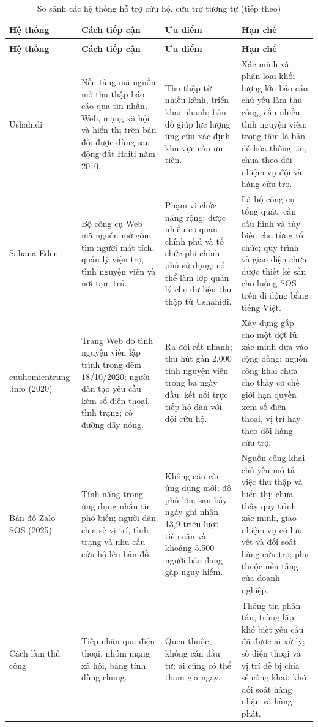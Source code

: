 \documentclass[12pt,a4paper,oneside]{report}
\begin{document}
{\small
\begin{longtable}{|L{2.4cm}|L{4.0cm}|L{3.9cm}|L{4.3cm}|}
  \caption{So sánh các hệ thống hỗ trợ cứu hộ, cứu trợ tương tự}\label{tab:similar-systems}\\
  \hline
  \centering\textbf{Hệ thống} & \centering\textbf{Cách tiếp cận} & \centering\textbf{Ưu điểm} & \centering\arraybackslash\textbf{Hạn chế} \\
  \hline
  \endfirsthead
  \caption[]{So sánh các hệ thống hỗ trợ cứu hộ, cứu trợ tương tự (tiếp theo)}\\
  \hline
  \centering\textbf{Hệ thống} & \centering\textbf{Cách tiếp cận} & \centering\textbf{Ưu điểm} & \centering\arraybackslash\textbf{Hạn chế} \\
  \hline
  \endhead
  Ushahidi & Nền tảng mã nguồn mở thu thập báo cáo qua tin nhắn, Web, mạng xã hội và hiển thị trên bản đồ; được dùng sau động đất Haiti năm 2010. & Thu thập từ nhiều kênh, triển khai nhanh; bản đồ giúp lực lượng ứng cứu xác định khu vực cần ưu tiên. & Xác minh và phân loại khối lượng lớn báo cáo chủ yếu làm thủ công, cần nhiều tình nguyện viên; trọng tâm là bản đồ hóa thông tin, chưa theo dõi nhiệm vụ đội và hàng cứu trợ. \\
  \hline
  Sahana Eden & Bộ công cụ Web mã nguồn mở gồm tìm người mất tích, quản lý viện trợ, tình nguyện viên và nơi tạm trú. & Phạm vi chức năng rộng; được nhiều cơ quan chính phủ và tổ chức phi chính phủ sử dụng; có thể làm lớp quản lý cho dữ liệu thu thập từ Ushahidi. & Là bộ công cụ tổng quát, cần cấu hình và tùy biến cho từng tổ chức; quy trình và giao diện chưa được thiết kế sẵn cho luồng SOS trên di động bằng tiếng Việt. \\
  \hline
  cuuhomientrung .info (2020) & Trang Web do tình nguyện viên lập trình trong đêm 18/10/2020; người dân tạo yêu cầu kèm số điện thoại, tình trạng; có đường dây nóng. & Ra đời rất nhanh; thu hút gần 2.000 tình nguyện viên trong ba ngày đầu; kết nối trực tiếp hộ dân với đội cứu hộ. & Xây dựng gấp cho một đợt lũ; xác minh dựa vào cộng đồng; nguồn công khai chưa cho thấy cơ chế giới hạn quyền xem số điện thoại, vị trí hay theo dõi hàng cứu trợ. \\
  \hline
  Bản đồ Zalo SOS (2025) & Tính năng trong ứng dụng nhắn tin phổ biến; người dân chia sẻ vị trí, tình trạng và nhu cầu cứu hộ lên bản đồ. & Không cần cài ứng dụng mới; độ phủ lớn: sau bảy ngày ghi nhận 13,9 triệu lượt tiếp cận và khoảng 5.500 người báo đang gặp nguy hiểm. & Nguồn công khai chủ yếu mô tả việc thu thập và hiển thị; chưa thấy quy trình xác minh, giao nhiệm vụ có lưu vết và đối soát hàng cứu trợ; phụ thuộc nền tảng của doanh nghiệp. \\
  \hline
  Cách làm thủ công & Tiếp nhận qua điện thoại, nhóm mạng xã hội, bảng tính dùng chung. & Quen thuộc, không cần đầu tư; ai cũng có thể tham gia ngay. & Thông tin phân tán, trùng lặp; khó biết yêu cầu đã được ai xử lý; số điện thoại và vị trí dễ bị chia sẻ công khai; khó đối soát hàng nhận và hàng phát. \\
  \hline
\end{longtable}}
\end{document}
